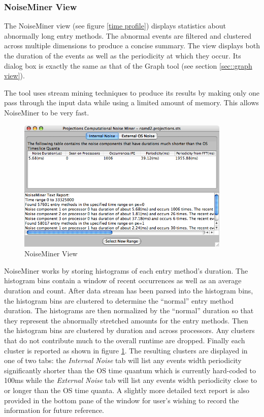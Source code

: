 
\subsubsection{NoiseMiner View}

The NoiseMiner view (see figure \ref{time profile}) displays statistics about abnormally long entry methods. The abnormal events are filtered and clustered across multiple dimensions to produce a concise summary. The view displays both the duration of the events as well as the periodicity at which they occur. Its dialog box is exactly the same as that of the Graph tool (see section \ref{sec::graph view}).

The tool uses stream mining techniques to produce its results by making only one pass through the input data while using a limited amount of memory. This allows NoiseMiner to be very fast. 

\begin{figure}[htb]
\center
\includegraphics[width=4.0in]{fig/noiseminer}
\caption{NoiseMiner View}
\label{noiseminer}
\end{figure}

NoiseMiner works by storing histograms of each entry method's duration. The histogram bins contain a window of recent occurrences as well as an average duration and count. After data stream has been parsed into the histogram bins, the histogram bins are clustered to determine the ``normal'' entry method duration. The histograms are then normalized by the ``normal'' duration so that they represent the abnormally stretched amounts for the entry methods. Then the histogram bins are clustered by duration and across processors. Any clusters that do not contribute much to the overall runtime are dropped. Finally each cluster is reported as shown in figure \ref{noiseminer}. The resulting clusters are displayed in one of two tabs: the \textit{Internal Noise} tab will list any events width periodicity significantly shorter than the OS time quantum which is currently hard-coded to 100ms while the \textit{External Noise} tab will list any events width periodicity close to or longer than the OS time quanta. A slightly more detailed text report is also provided in the bottom pane of the window for user's wishing to record the information for future reference.